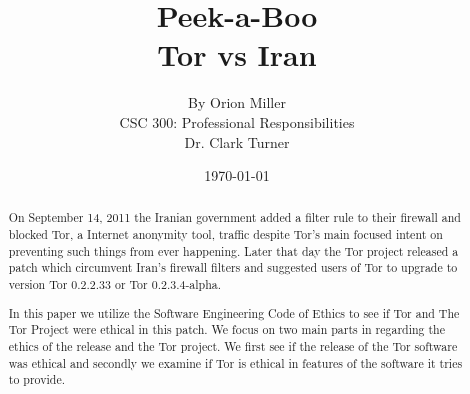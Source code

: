 \documentclass[11pt]{article}
\begin{document}
\title{\vfill Peek-a-Boo \\ \large Tor vs Iran}
\author{ 
  By Orion Miller\vspace{10pt} \\
  CSC 300: Professional Responsibilities \vspace{10pt} \\
  Dr. Clark Turner\vspace{10pt} \\
}
\date{\today}

\maketitle

\vfill  %
\begin{abstract} 

On September 14, 2011 the Iranian government added a filter rule to their
firewall and blocked Tor, a Internet anonymity tool, traffic despite Tor's main
focused intent on preventing such things from ever happening.
\cite{IranBlocksTorSameDayFix} Later that day the Tor project released a patch
which circumvent Iran's firewall filters and suggested users of Tor to upgrade
to version Tor 0.2.2.33 or Tor 0.2.3.4-alpha.\cite{IranBlocksTorSameDayFix}

In this paper we utilize the Software Engineering Code of Ethics to see if Tor
and The Tor Project were ethical in this patch. We focus on two main parts in
regarding the ethics of the release and the Tor project. We first see if the
release of the Tor software was ethical and secondly we examine if Tor is
ethical in features of the software it tries to provide.


\end{abstract}

\thispagestyle{empty} %

\newpage


\tableofcontents

\newpage

\end{document}
